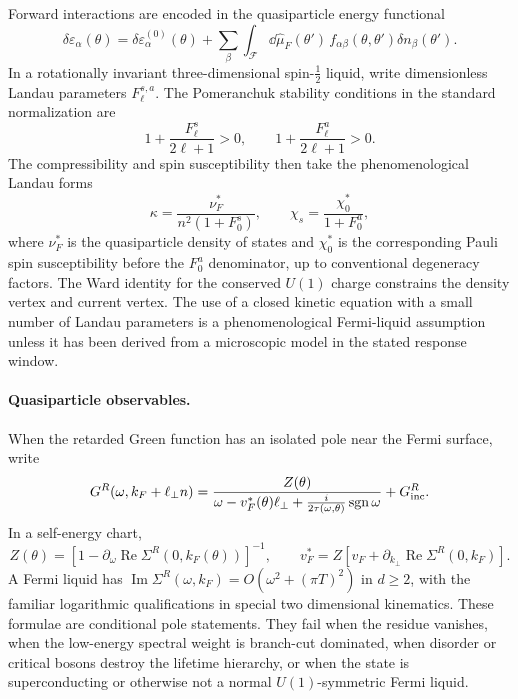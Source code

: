 Forward interactions are encoded in the quasiparticle energy functional
\[
  \delta\varepsilon_\alpha(\theta)
  =
  \delta\varepsilon_\alpha^{(0)}(\theta)
  +
  \sum_\beta\int_{\mathcal F}\dd\widehat\mu_F(\theta')\,
  f_{\alpha\beta}(\theta,\theta')\delta n_\beta(\theta').
\]
In a rotationally invariant three-dimensional spin-\(\frac12\) liquid, write
dimensionless Landau parameters \(F_\ell^{s,a}\).  The Pomeranchuk stability
conditions in the standard normalization are
\begin{equation}
  1+\frac{F_\ell^{s}}{2\ell+1}>0,
  \qquad
  1+\frac{F_\ell^{a}}{2\ell+1}>0.
  \label{eq:fermi-pomeranchuk-stability}
\end{equation}
The compressibility and spin susceptibility then take the phenomenological
Landau forms
\begin{equation}
  \kappa
  =
  \frac{\nu_F^*}{n^2(1+F_0^s)},
  \qquad
  \chi_s
  =
  \frac{\chi_0^*}{1+F_0^a},
  \label{eq:fermi-landau-responses}
\end{equation}
where \(\nu_F^*\) is the quasiparticle density of states and \(\chi_0^*\) is
the corresponding Pauli spin susceptibility before the \(F_0^a\) denominator,
up to conventional degeneracy factors.  The Ward identity for the conserved
\(U(1)\) charge constrains the density vertex and current vertex.  The use of a
closed kinetic equation with a small number of Landau parameters is a
phenomenological Fermi-liquid assumption unless it has been derived from a
microscopic model in the stated response window.

\paragraph{Quasiparticle observables.}
When the retarded Green function has an isolated pole near the Fermi surface,
write
\begin{equation}
  G^R(\omega,k_F+\ell_\perp n)
  =
  \frac{Z(\theta)}
  {\omega-v_F^*(\theta)\ell_\perp
    +\frac{i}{2\tau(\omega,\theta)}\operatorname{sgn}\omega}
  +
  G_{\rm inc}^R .
  \label{eq:fermi-quasiparticle-pole}
\end{equation}
In a self-energy chart,
\[
  Z(\theta)
  =
  \left[
    1-\partial_\omega\operatorname{Re}\Sigma^R(0,k_F(\theta))
  \right]^{-1},
  \qquad
  v_F^*
  =
  Z\left[
    v_F+\partial_{k_\perp}\operatorname{Re}\Sigma^R(0,k_F)
  \right].
\]
A Fermi liquid has
\(\operatorname{Im}\Sigma^R(\omega,k_F)=O(\omega^2+(\pi T)^2)\) in
\(d\ge2\), with the familiar logarithmic qualifications in special two
dimensional kinematics.  These formulae are conditional pole statements.  They
fail when the residue vanishes, when the low-energy spectral weight is
branch-cut dominated, when disorder or critical bosons destroy the lifetime
hierarchy, or when the state is superconducting or otherwise not a normal
\(U(1)\)-symmetric Fermi liquid.

